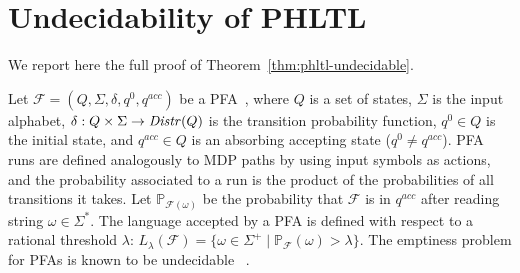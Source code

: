 
\section{Undecidability of \acs{PHLTL}}
\label{appendix:undec}

We report here the full proof of Theorem~\ref{thm:phltl-undecidable}.

Let $\mathcal{F} = (Q, \Sigma, \delta, q^0, q^\mathit{acc})$ be a \ac{PFA}~\cite{Paz71}, 
where $Q$ is a set of states, $\Sigma$ is the input alphabet, 
$\delta : Q \times \Sigma \rightarrow \mathit{Distr}(Q)$ is the transition probability function, 
$q^0 \in Q$ is the initial state, and $q^\mathit{acc} \in Q$ is an absorbing accepting state ($q^0 \neq q^\mathit{acc}$).
\ac{PFA} runs are defined analogously to \ac{MDP} paths by using input symbols as actions,
and the probability associated to a run is the product of the probabilities of all transitions it takes.
Let $\mathbb{P}_{\mathcal{F} (\omega)}$ be the probability 
that $\mathcal{F}$ is in $q^\mathit{acc}$ after reading string $\omega \in \Sigma^*$. 
The language accepted by a \ac{PFA} is defined with respect to a rational threshold $\lambda$: 
$L_{\lambda}(\mathcal{F}) = \{ \omega \in \Sigma^{+} \mid 
\mathbb{P}_{\mathcal{F}}(\omega) > \lambda \}$.
The emptiness problem for \acp{PFA} is known to be undecidable ~\cite{NasuH69,condon1989complexity,Freivalds81}.

